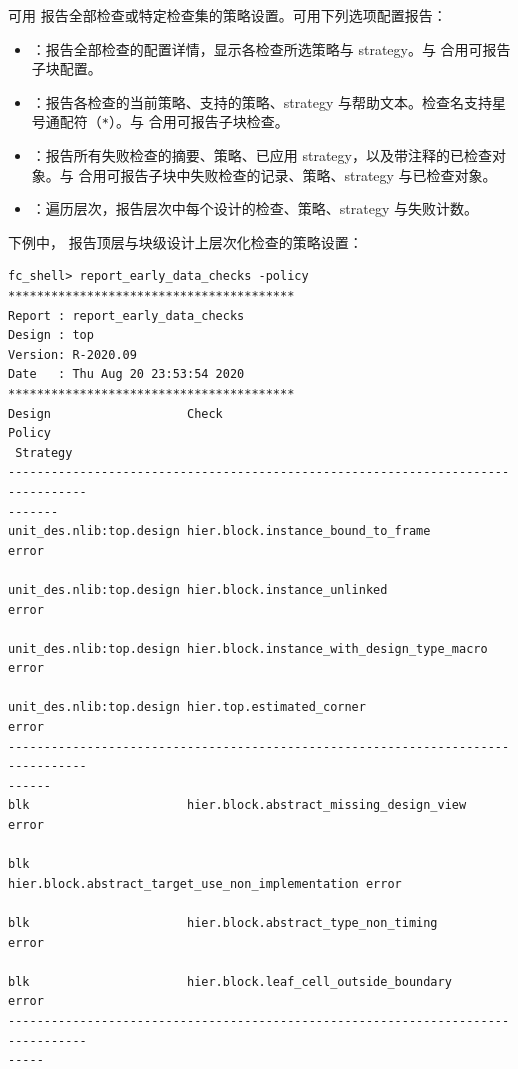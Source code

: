 可用  报告全部检查或特定检查集的策略设置。可用下列选项配置报告：
\begin{itemize}
  \item {}：报告全部检查的配置详情，显示各检查所选策略与 strategy。与  合用可报告子块配置。
  \item {}：报告各检查的当前策略、支持的策略、strategy 与帮助文本。检查名支持星号通配符（\texttt{*}）。与  合用可报告子块检查。
  \item {}：报告所有失败检查的摘要、策略、已应用 strategy，以及带注释的已检查对象。与  合用可报告子块中失败检查的记录、策略、strategy 与已检查对象。
  \item {}：遍历层次，报告层次中每个设计的检查、策略、strategy 与失败计数。
\end{itemize}

下例中， 报告顶层与块级设计上层次化检查的策略设置：
\begin{lstlisting}
fc_shell> report_early_data_checks -policy
****************************************
Report : report_early_data_checks
Design : top
Version: R-2020.09
Date   : Thu Aug 20 23:53:54 2020
****************************************
Design                   Check                                             Policy
 Strategy
---------------------------------------------------------------------------------
-------
unit_des.nlib:top.design hier.block.instance_bound_to_frame                error

unit_des.nlib:top.design hier.block.instance_unlinked                      error

unit_des.nlib:top.design hier.block.instance_with_design_type_macro        error

unit_des.nlib:top.design hier.top.estimated_corner                         error
---------------------------------------------------------------------------------
------
blk                      hier.block.abstract_missing_design_view           error

blk                      hier.block.abstract_target_use_non_implementation error

blk                      hier.block.abstract_type_non_timing               error

blk                      hier.block.leaf_cell_outside_boundary             error
---------------------------------------------------------------------------------
-----
\end{lstlisting}

